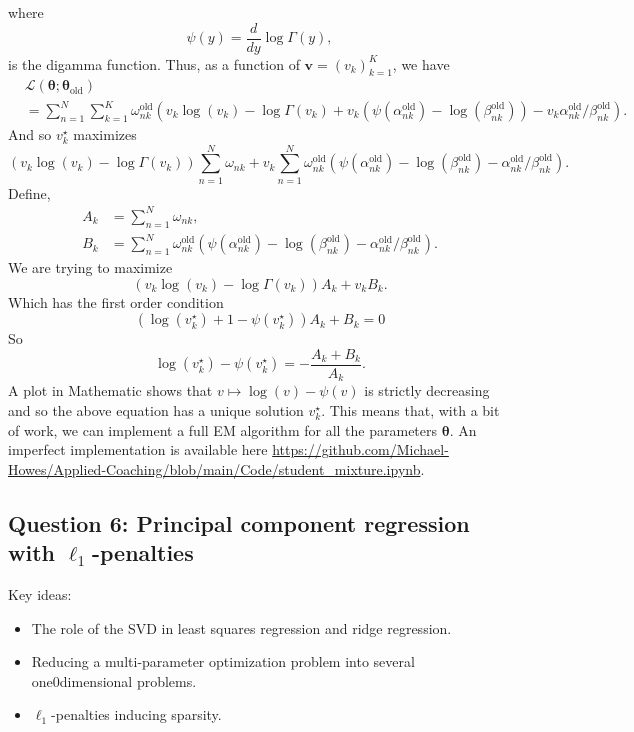 where
\[\psi(y)= \frac{d}{dy}\log \Gamma(y), \]
is the digamma function. Thus, as a function of $\bm{v}=(v_k)_{k=1}^K$, we have
\begin{align*}
    &\mathcal{L}(\bm{\theta};\bm{\theta}_{\text{old}})\\
    &=\sum_{n=1}^N \sum_{k=1}^K \omega_{nk}^{\text{old}}\left(v_k\log(v_k)-\log \Gamma(v_k)+v_k\left(\psi\left(\alpha_{nk}^{\text{old}}\right) - \log\left(\beta_{nk}^{\text{old}}\right)\right) -v_k\alpha_{nk}^{\text{old}}/\beta_{nk}^{\text{old}}\right).
\end{align*}
And so $v_k^\star$ maximizes
\[ \left(v_k\log(v_k)-\log \Gamma(v_k)\right)\sum_{n=1}^N\omega_{nk} +v_k \sum_{n=1}^N \omega_{nk}^{\text{old}}\left(\psi\left(\alpha_{nk}^{\text{old}}\right) - \log\left(\beta_{nk}^{\text{old}}\right)-\alpha_{nk}^{\text{old}}/\beta_{nk}^{\text{old}}\right).  \]
Define,
\begin{align*}
    A_k &= \sum_{n=1}^N\omega_{nk},\\
    B_k &= \sum_{n=1}^N \omega_{nk}^{\text{old}}\left(\psi\left(\alpha_{nk}^{\text{old}}\right) - \log\left(\beta_{nk}^{\text{old}}\right)-\alpha_{nk}^{\text{old}}/\beta_{nk}^{\text{old}}\right).
\end{align*}
We are trying to maximize
\[(v_k\log(v_k)-\log \Gamma(v_k))A_k + v_kB_k. \]
Which has the first order condition
\[\left(\log(v_k^\star)+1 -\psi(v_k^\star)\right)A_k + B_k = 0 \]
So
\[\log(v_k^\star) - \psi(v_k^\star) = -\frac{A_k+B_k}{A_k}. \]
A plot in Mathematic shows that $v \mapsto \log(v) - \psi(v)$ is strictly decreasing and so the above equation has a unique solution $v_k^\star$. This means that, with a bit of work, we can implement a full EM algorithm for all the parameters $\bm{\theta}$. An imperfect implementation is available here \url{https://github.com/Michael-Howes/Applied-Coaching/blob/main/Code/student_mixture.ipynb}.

\subsection*{Question 6: Principal component regression with $\ell_1$-penalties}

Key ideas:
\begin{itemize}
    \item The role of the SVD in least squares regression and ridge regression.
    \item Reducing a multi-parameter optimization problem into several one0dimensional problems.
    \item $\ell_1$-penalties inducing sparsity.
\end{itemize}

